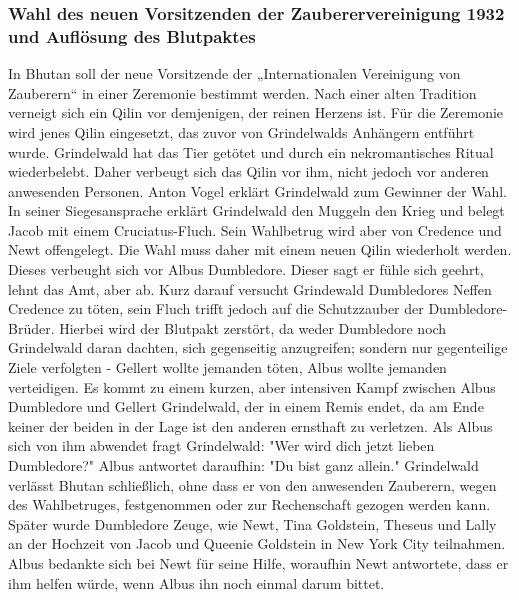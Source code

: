 \documentclass[a4paper, 10pt]{article}
\begin{document}
\subsubsection*{Wahl des neuen Vorsitzenden der Zauberervereinigung 1932 und Auflösung des Blutpaktes}
In Bhutan soll der neue Vorsitzende der „Internationalen Vereinigung von Zauberern“ in einer Zeremonie bestimmt werden. Nach einer alten Tradition verneigt sich ein Qilin vor demjenigen, der reinen Herzens ist. Für die Zeremonie wird jenes Qilin eingesetzt, das zuvor von Grindelwalds Anhängern entführt wurde. Grindelwald hat das Tier getötet und durch ein nekromantisches Ritual wiederbelebt. Daher verbeugt sich das Qilin vor ihm, nicht jedoch vor anderen anwesenden Personen. Anton Vogel erklärt Grindelwald zum Gewinner der Wahl.
\vspace{10pt}
\newline
In seiner Siegesansprache erklärt Grindelwald den Muggeln den Krieg und belegt Jacob mit einem Cruciatus-Fluch. Sein Wahlbetrug wird aber von Credence und Newt offengelegt. Die Wahl muss daher mit einem neuen Qilin wiederholt werden. Dieses verbeught sich vor Albus Dumbledore. Dieser sagt er fühle sich geehrt, lehnt das Amt, aber ab. Kurz darauf versucht Grindewald Dumbledores Neffen Credence zu töten, sein Fluch trifft jedoch auf die Schutzzauber der Dumbledore-Brüder. Hierbei wird der Blutpakt zerstört, da weder Dumbledore noch Grindelwald daran dachten, sich gegenseitig anzugreifen; sondern nur gegenteilige Ziele verfolgten - Gellert wollte jemanden töten, Albus wollte jemanden verteidigen.
\vspace{10pt}
\newline
Es kommt zu einem kurzen, aber intensiven Kampf zwischen Albus Dumbledore und Gellert Grindelwald, der in einem Remis endet, da am Ende keiner der beiden in der Lage ist den anderen ernsthaft zu verletzen. Als Albus sich von ihm abwendet fragt Grindelwald: "Wer wird dich jetzt lieben Dumbledore?" Albus antwortet daraufhin: "Du bist ganz allein." Grindelwald verlässt Bhutan schließlich, ohne dass er von den anwesenden Zauberern, wegen des Wahlbetruges, festgenommen oder zur Rechenschaft gezogen werden kann. Später wurde Dumbledore Zeuge, wie Newt, Tina Goldstein, Theseus und Lally an der Hochzeit von Jacob und Queenie Goldstein in New York City teilnahmen. Albus bedankte sich bei Newt für seine Hilfe, woraufhin Newt antwortete, dass er ihm helfen würde, wenn Albus ihn noch einmal darum bittet.
\end{document}
